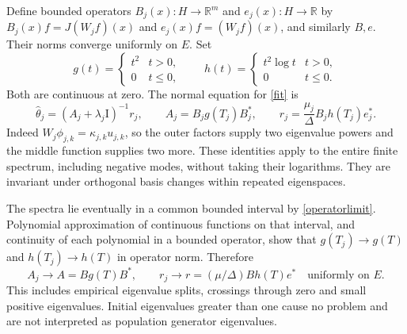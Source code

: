 \documentclass[11pt]{article}
\theoremstyle{remark}\newtheorem{remark}[theorem]{Remark}
\newcommand{\R}{\mathbb R}
\newcommand{\Id}{\mathrm I}
\begin{document}
Define bounded operators $B_j(x):H\to\R^m$ and $e_j(x):H\to\R$ by
$B_j(x)f=J(W_j f)(x)$ and $e_j(x)f=(W_j f)(x)$, and similarly $B,e$.
Their norms converge uniformly on $E$. Set
\begin{equation}\label{functions}
 g(t)=\begin{cases}t^2&t>0,\\0&t\leq0,\end{cases}\qquad
 h(t)=\begin{cases}t^2\log t&t>0,\\0&t\leq0.\end{cases}
\end{equation}
Both are continuous at zero. The normal equation for \eqref{fit} is
\begin{equation}\label{normal}
 \widehat\theta_j=(A_j+\lambda_j\Id)^{-1}r_j,\qquad
 A_j=B_jg(T_j)B_j^*,\qquad
 r_j=\frac{\mu_j}{\Delta}B_jh(T_j)e_j^*.
\end{equation}
Indeed $W_j\phi_{j,k}=\kappa_{j,k}u_{j,k}$, so the outer factors supply
two eigenvalue powers and the middle function supplies two more. These
identities apply to the entire finite spectrum, including negative modes,
without taking their logarithms. They are invariant under orthogonal basis
changes within repeated eigenspaces.

The spectra lie eventually in a common bounded interval by
\eqref{operatorlimit}. Polynomial approximation of continuous functions on
that interval, and continuity of each polynomial in a bounded operator,
show that $g(T_j)\to g(T)$ and $h(T_j)\to h(T)$ in operator norm. Therefore
\begin{equation}\label{normalconvergence}
 A_j\longrightarrow A=Bg(T)B^*,\qquad
 r_j\longrightarrow r=(\mu/\Delta)Bh(T)e^*
 \quad\text{uniformly on }E.
\end{equation}
This includes empirical eigenvalue splits, crossings through zero and small
positive eigenvalues. Initial eigenvalues greater than one cause no problem
and are not interpreted as population generator eigenvalues.
\end{document}
